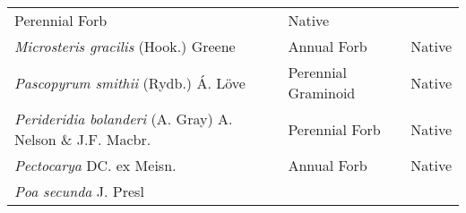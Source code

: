 \documentclass[8pt,]{article}
\begin{document}
\begin{longtable}[]{@{}lll@{}}
\begin{minipage}[t]{0.27\columnwidth}
Perennial Forb\strut
\end{minipage} & \begin{minipage}[t]{0.15\columnwidth}\raggedright\strut
Native\strut
\end{minipage}\tabularnewline
\begin{minipage}[t]{0.49\columnwidth}\raggedright\strut
\emph{Microsteris gracilis} (Hook.) Greene\strut
\end{minipage} & \begin{minipage}[t]{0.27\columnwidth}\raggedright\strut
Annual Forb\strut
\end{minipage} & \begin{minipage}[t]{0.15\columnwidth}\raggedright\strut
Native\strut
\end{minipage}\tabularnewline
\begin{minipage}[t]{0.49\columnwidth}\raggedright\strut
\emph{Pascopyrum smithii} (Rydb.) Á. Löve\strut
\end{minipage} & \begin{minipage}[t]{0.27\columnwidth}\raggedright\strut
Perennial Graminoid\strut
\end{minipage} & \begin{minipage}[t]{0.15\columnwidth}\raggedright\strut
Native\strut
\end{minipage}\tabularnewline
\begin{minipage}[t]{0.49\columnwidth}\raggedright\strut
\emph{Perideridia bolanderi} (A. Gray) A. Nelson \& J.F. Macbr.\strut
\end{minipage} & \begin{minipage}[t]{0.27\columnwidth}\raggedright\strut
Perennial Forb\strut
\end{minipage} & \begin{minipage}[t]{0.15\columnwidth}\raggedright\strut
Native\strut
\end{minipage}\tabularnewline
\begin{minipage}[t]{0.49\columnwidth}\raggedright\strut
\emph{Pectocarya} DC. ex Meisn.\strut
\end{minipage} & \begin{minipage}[t]{0.27\columnwidth}\raggedright\strut
Annual Forb\strut
\end{minipage} & \begin{minipage}[t]{0.15\columnwidth}\raggedright\strut
Native\strut
\end{minipage}\tabularnewline
\begin{minipage}[t]{0.49\columnwidth}\raggedright\strut
\emph{Poa secunda} J. Presl\strut

\end{minipage}
\end{longtable}
\end{document}
